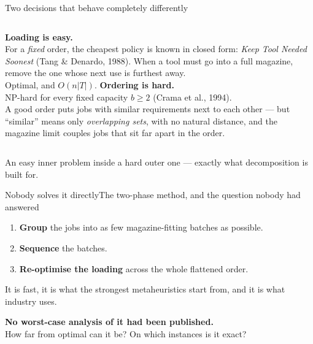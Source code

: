 \documentclass[11pt,aspectratio=169]{beamer}
\newcommand{\keyline}[1]{\vspace{0.4em}{\color{cRule}\rule{\textwidth}{0.4pt}}\vspace{0.3em}\par#1}
\begin{document}
\begin{frame}{Two decisions that behave completely differently}
\vspace{0.8em}
\begin{columns}[T]
\textbf{Loading is easy.}\\[0.5em]
{\small For a \emph{fixed} order, the cheapest policy is known in closed form:
\emph{Keep Tool Needed Soonest} (Tang \& Denardo, 1988). When a tool must go into a
full magazine, remove the one whose next use is furthest away.\\[0.6em]
Optimal, and $O(n|T|)$.}
\textbf{Ordering is hard.}\\[0.5em]
{\small NP-hard for every fixed capacity $b \ge 2$ (Crama et al., 1994).\\[0.6em]
A good order puts jobs with similar requirements next to each other --- but ``similar''
means only \emph{overlapping sets}, with no natural distance, and the magazine limit
couples jobs that sit far apart in the order.}
\end{columns}
\vspace{1.2em}
\keyline{}
\centering
An easy inner problem inside a hard outer one --- exactly what decomposition is built for.
\end{frame}

\begin{frame}{Nobody solves it directly}{The two-phase method, and the question nobody had answered}
\vspace{0.5em}
\begin{enumerate}\itemsep4pt
  \item \textbf{Group} the jobs into as few magazine-fitting batches as possible.
  \item \textbf{Sequence} the batches.
  \item \textbf{Re-optimise the loading} across the whole flattened order.
\end{enumerate}
\vspace{0.8em}
{\small It is fast, it is what the strongest metaheuristics start from, and it is what
industry uses.}
\vspace{1.0em}
\keyline{}
\begin{center}
\textbf{No worst-case analysis of it had been published.}\\[0.4em]
{\small How far from optimal can it be? On which instances is it exact?}
\end{center}
\end{frame}
\end{document}
